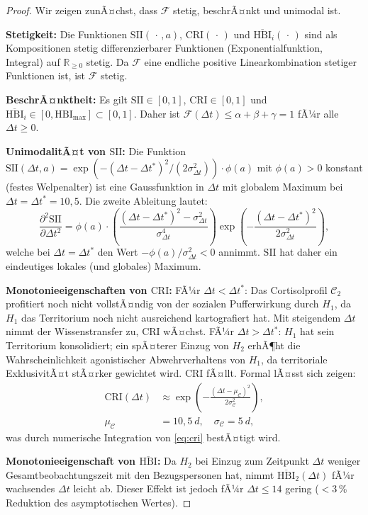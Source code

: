 ﻿\documentclass[12pt, a4paper]{article}
\theoremstyle{plain}
\theoremstyle{definition}
\theoremstyle{remark}
\newcommand{\HBI}{\mathrm{HBI}}
\newcommand{\SII}{\mathrm{SII}}
\newcommand{\CRI}{\mathrm{CRI}}
\newcommand{\R}{\mathbb{R}}
\newcommand{\dt}{\Delta t}
\newcommand{\cort}{\mathcal{C}}
\begin{document}
\begin{proof}
Wir zeigen zunÃ¤chst, dass $\mathcal{F}$ stetig, beschrÃ¤nkt und unimodal ist.

\textbf{Stetigkeit:} Die Funktionen $\SII(\,\cdot\,, a)$, $\CRI(\,\cdot\,)$
und $\overline{\HBI}_i(\,\cdot\,)$ sind als Kompositionen stetig differenzierbarer
Funktionen (Exponentialfunktion, Integral) auf $\R_{\geq 0}$ stetig. Da
$\mathcal{F}$ eine endliche positive Linearkombination stetiger Funktionen ist,
ist $\mathcal{F}$ stetig.

\textbf{BeschrÃ¤nktheit:} Es gilt $\SII \in [0,1]$, $\CRI \in [0,1]$ und
$\overline{\HBI}_i \in [0, \HBI_{\mathrm{max}}] \subset [0,1]$. Daher ist
$\mathcal{F}(\dt) \leq \alpha + \beta + \gamma = 1$ fÃ¼r alle $\dt \geq 0$.

\textbf{UnimodalitÃ¤t von $\SII$:} Die Funktion $\SII(\dt, a) = \exp(-(\dt -
\dt^*)^2 / (2\sigma_{\dt}^2)) \cdot \phi(a)$ mit $\phi(a) > 0$ konstant (festes
Welpenalter) ist eine Gaussfunktion in $\dt$ mit globalem Maximum bei
$\dt = \dt^* = 10{,}5$. Die zweite Ableitung lautet:
\begin{equation}
  \frac{\partial^2 \SII}{\partial \dt^2} = \phi(a) \cdot \left(\frac{(\dt - \dt^*)^2 - \sigma_{\dt}^2}{\sigma_{\dt}^4}\right)
  \exp\!\left(-\frac{(\dt-\dt^*)^2}{2\sigma_{\dt}^2}\right),
\end{equation}
welche bei $\dt = \dt^*$ den Wert $-\phi(a)/\sigma_{\dt}^2 < 0$ annimmt.
$\SII$ hat daher ein eindeutiges lokales (und globales) Maximum.

\textbf{Monotonieeigenschaften von $\CRI$:}
FÃ¼r $\dt < \dt^*$: Das Cortisolprofil $\cort_2$ profitiert noch nicht
vollstÃ¤ndig von der sozialen Pufferwirkung durch $H_1$, da $H_1$ das Territorium
noch nicht ausreichend kartografiert hat. Mit steigendem $\dt$ nimmt der
Wissenstransfer zu, $\CRI$ wÃ¤chst. FÃ¼r $\dt > \dt^*$: $H_1$ hat sein Territorium
konsolidiert; ein spÃ¤terer Einzug von $H_2$ erhÃ¶ht die Wahrscheinlichkeit
agonistischer Abwehrverhaltens von $H_1$, da territoriale ExklusivitÃ¤t stÃ¤rker
gewichtet wird. $\CRI$ fÃ¤llt. Formal lÃ¤sst sich zeigen:
\begin{align}
  \CRI(\dt) &\approx \exp\!\left(-\frac{(\dt - \mu_{\cort})^2}{2\sigma_{\cort}^2}\right),\\
  \mu_{\cort} &= 10{,}5\ \si{d},\quad \sigma_{\cort} = 5\ \si{d},
\end{align}
was durch numerische Integration von \cref{eq:cri} bestÃ¤tigt wird.

\textbf{Monotonieeigenschaft von $\overline{\HBI}$:} Da $H_2$ bei Einzug zum
Zeitpunkt $\dt$ weniger Gesamtbeobachtungszeit mit den Bezugspersonen hat,
nimmt $\overline{\HBI}_2(\dt)$ fÃ¼r wachsendes $\dt$ leicht ab. Dieser Effekt ist
jedoch fÃ¼r $\dt \leq 14$ gering ($<$3\,\% Reduktion des asymptotischen Wertes).


\end{proof}
\end{document}
